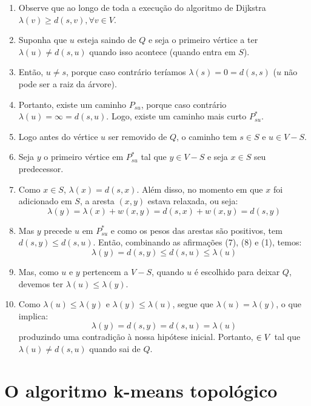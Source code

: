 \documentclass[sn-mathphys,Numbered]{sn-jnl}%
\theoremstyle{thmstyleone}%
\theoremstyle{thmstyletwo}%
\theoremstyle{thmstylethree}%
\begin{document}
\begin{enumerate}
	\item Observe que ao longo de toda a execução do algoritmo de Dijkstra $\lambda(v) \geq d(s, v), \forall v \in V$.
	\item Suponha que $u$ esteja saindo de $Q$ e seja o primeiro vértice a ter $\lambda(u) \neq d(s, u)$ quando isso acontece (quando entra em $S$).
	\item Então, $u \neq s$, porque caso contrário teríamos $\lambda(s) = 0 = d(s, s)$ ($u$ não pode ser a raiz da árvore).
	\item Portanto, existe um caminho $P_{su}$, porque caso contrário $\lambda(u) = \infty = d(s, u)$. Logo, existe um caminho mais curto $P_{su}^{*}$.
	\item Logo antes do vértice $u$ ser removido de $Q$, o caminho tem $s \in S$ e $u \in V - S$.
	\item Seja $y$ o primeiro vértice em $P_{su}^{*}$ tal que $y \in V - S$ e seja $x \in S$ seu predecessor.
	\item Como $x \in S$, $\lambda(x) = d(s, x)$. Além disso, no momento em que $x$ foi adicionado em $S$, a aresta $(x, y)$ estava relaxada, ou seja:
	\begin{equation}
		\lambda(y) = \lambda(x) + w(x, y) = d(s, x) + w(x, y) = d(s, y)
	\end{equation}	  
	\item Mas $y$ precede $u$ em $P_{su}^{*}$ e como os pesos das arestas são positivos, tem $d(s, y) \leq d(s, u)$. Então, combinando as afirmações (7), (8) e (1), temos:
	\begin{equation}
		\lambda(y) = d(s, y) \leq d(s, u) \leq \lambda(u)
	\end{equation}
	\item Mas, como $u$ e $y$ pertencem a $V - S$, quando $u$ é escolhido para deixar $Q$, devemos ter $\lambda(u) \leq \lambda(y)$.
	\item Como $\lambda(u) \leq \lambda(y)$ e $\lambda(y) \leq \lambda(u)$, segue que $\lambda(u) = \lambda(y)$, o que implica:
	\begin{equation}
		\lambda(y) = d(s, y) = d(s, u) = \lambda(u)
	\end{equation} produzindo uma contradição à nossa hipótese inicial. Portanto, $\next u \in V$ tal que $\lambda(u) \neq d(s, u)$ quando sai de $Q$.
\end{enumerate}


\section{O algoritmo k-means topológico }
\end{document}
